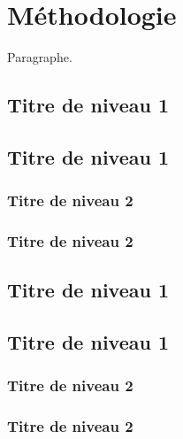 \chapter{Méthodologie} \label{chap:metho}

Paragraphe. \lipsum[1] %


\section{Titre de niveau 1}\label{sec:metho-1}

\lipsum[1-2] %

\section{Titre de niveau 1}\label{sec:metho-2}

\subsection{Titre de niveau 2}\label{subsec:metho-2-1}

\lipsum[1] %


\subsection{Titre de niveau 2}\label{subsec:metho-2-2}

\lipsum[1] %


\section{Titre de niveau 1}\label{sec:metho-3}

\lipsum[1] %

\section{Titre de niveau 1}\label{sec:metho-4}

\subsection{Titre de niveau 2}\label{subsec:metho-4-1}

\lipsum[1] %

\subsection{Titre de niveau 2}\label{subsec:metho-4-2}

